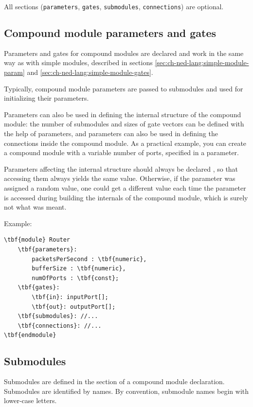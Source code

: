All sections (\texttt{parameters}, \texttt{gates}, \texttt{submodules},
\texttt{connections}) are optional.



\subsection{Compound module parameters and gates}

Parameters and gates 
for compound modules are declared and work in the same way
as with simple modules, described in sections
\ref{sec:ch-ned-lang:simple-module-param}
and \ref{sec:ch-ned-lang:simple-module-gates}.

Typically, compound module parameters are passed to submodules and
used for initializing their parameters.

Parameters can also be used in defining the internal structure of
the compound module: the number of submodules and sizes of gate vectors
can be defined with the help of parameters, and parameters can
also be used in defining the connections inside the compound module.
As a practical example, you can create a  compound module
with a variable number of ports, specified in a  parameter.

Parameters affecting the internal structure should always be declared
, so that accessing them always yields the same value.
Otherwise, if the parameter was assigned a random value, one could
get a different value each time the parameter is accessed during building
the internals of the compound module, which is surely not what was meant.

Example:

\begin{Verbatim}[commandchars=\\\{\}]
\tbf{module} Router
    \tbf{parameters}:
        packetsPerSecond : \tbf{numeric},
        bufferSize : \tbf{numeric},
        numOfPorts : \tbf{const};
    \tbf{gates}:
        \tbf{in}: inputPort[];
        \tbf{out}: outputPort[];
    \tbf{submodules}: //...
    \tbf{connections}: //...
\tbf{endmodule}
\end{Verbatim}


\subsection{Submodules}

Submodules are defined in the
 section of a compound
module declaration. Submodules are identified by names.
By convention, submodule names begin with lower-case letters.


